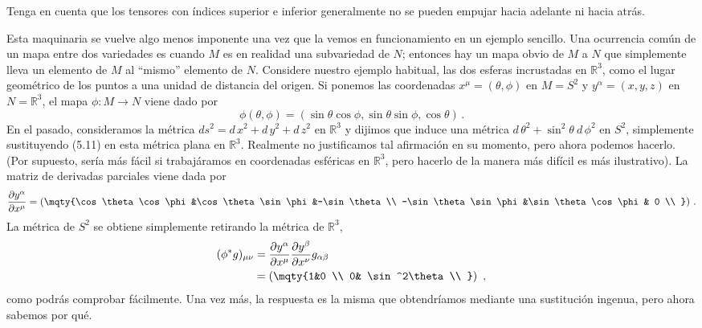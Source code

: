 \documentclass[11pt,b5paper,openany,twoside]{book}
\newcommand{\mn}{{\mu\nu}}
\newcommand{\R}{\mathbb{R}}
\begin{document}
\noindent
Tenga en cuenta que los tensores con índices superior e inferior generalmente no se pueden empujar hacia adelante ni hacia atrás.

Esta maquinaria se vuelve algo menos imponente una vez que la vemos en funcionamiento en un ejemplo sencillo.
Una ocurrencia común de un mapa entre dos variedades es cuando $M$ es en realidad una subvariedad de $N$; entonces hay un mapa obvio de $M$ a $N$ que simplemente lleva un elemento de $M$ al ``mismo'' elemento de $N$.
Considere nuestro ejemplo habitual, las dos esferas incrustadas en $\R^3$, como el lugar geométrico de los puntos a una unidad de distancia del origen.
Si ponemos las coordenadas $x^\mu=(\theta,\phi)$ en $M=S^2$ y $y^\alpha=(x,y,z)$ en $N=\R^3$, el mapa $\phi:M\rightarrow N$ viene dado por
\begin{equation}
\phi(\theta,\phi)=(\sin\theta \cos\phi,\sin\theta \sin\phi,
\cos\theta)\,.\label{5.11}
\end{equation}
En el pasado, consideramos la métrica $ds^2= d\,x^2+ d\,y^2+  d\,z^2$ en $\R^3$ y dijimos que induce una métrica $ d\,\theta^2 +\sin^2\theta~ d\,\phi^2$ en $S^2$, simplemente sustituyendo (5.11) en esta métrica plana en $\R^3$.
Realmente no justificamos tal afirmación en su momento, pero ahora podemos hacerlo.
(Por supuesto, sería más fácil si trabajáramos en coordenadas esféricas en $\R^3$, pero hacerlo de la manera más difícil es más ilustrativo).
La matriz de derivadas parciales viene dada por
\begin{equation}
{{\partial y^{\alpha}}\over{\partial x^{\mu}}}=
\left(\mqty{\cos\theta \cos\phi &\cos\theta \sin\phi &-\sin\theta \\
-\sin\theta \sin\phi &\sin\theta \cos\phi & 0 \\ }\right)\,.\label{5.12}
\end{equation}
La métrica de $S^2$ se obtiene simplemente retirando la métrica de $\R^3$,
\begin{align}
(\phi^* g)_\mn  &=  {{\partial y^{\alpha}}
\over{\partial x^{\mu}}}{{\partial y^{\beta}}
\over{\partial x^{\nu}}}g_{\alpha\beta} \notag \\
&=  \left(\mqty{1&0 \\  0& \sin^2\theta \\ }\right)\ ,\label{5.13}
\end{align}
como podrás comprobar fácilmente.
Una vez más, la respuesta es la misma que obtendríamos mediante una sustitución ingenua, pero ahora sabemos por qué.
\end{document}
